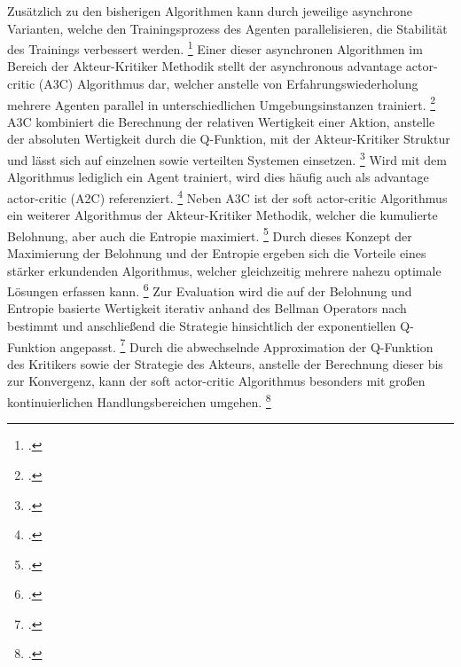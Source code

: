 Zusätzlich zu den bisherigen Algorithmen kann durch jeweilige asynchrone Varianten, welche den Trainingsprozess des Agenten parallelisieren, die Stabilität des Trainings verbessert werden. \footcite[Vgl.][S. 1]{Mnih.2016}
Einer dieser asynchronen Algorithmen im Bereich der Akteur-Kritiker Methodik stellt der asynchronous advantage actor-critic (A3C) Algorithmus dar, welcher anstelle von Erfahrungswiederholung mehrere Agenten parallel in unterschiedlichen Umgebungsinstanzen trainiert. \footcite[Vgl.][S. 1]{Mnih.2016}
A3C kombiniert die Berechnung der relativen Wertigkeit einer Aktion, anstelle der absoluten Wertigkeit durch die Q-Funktion, mit der Akteur-Kritiker Struktur und lässt sich auf einzelnen sowie verteilten Systemen einsetzen. \footcite[Vgl.][S. 9]{Arulkumaran.2017} 
Wird mit dem Algorithmus lediglich ein Agent trainiert, wird dies häufig auch als advantage actor-critic (A2C) referenziert. \footcite[Vgl.][S. 9]{Arulkumaran.2017} 
Neben A3C ist der soft actor-critic Algorithmus ein weiterer Algorithmus der Akteur-Kritiker Methodik, welcher die kumulierte Belohnung, aber auch die Entropie maximiert. \footcite[Vgl.][S. 1]{Haarnoja.2018}
Durch dieses Konzept der Maximierung der Belohnung und der Entropie ergeben sich die Vorteile eines stärker erkundenden Algorithmus, welcher gleichzeitig mehrere nahezu optimale Lösungen erfassen kann. \footcite[Vgl.][S. 3]{Haarnoja.2018}
Zur Evaluation wird die auf der Belohnung und Entropie basierte Wertigkeit iterativ anhand des Bellman Operators nach \cite[]{Bellman.1966} bestimmt und anschließend die Strategie hinsichtlich der exponentiellen Q-Funktion angepasst. \footcite[Vgl.][S. 4]{Haarnoja.2018}
Durch die abwechselnde Approximation der Q-Funktion des Kritikers sowie der Strategie des Akteurs, anstelle der Berechnung dieser bis zur Konvergenz, kann der soft actor-critic Algorithmus besonders mit großen kontinuierlichen Handlungsbereichen umgehen. \footcite[Vgl.][S. 4]{Haarnoja.2018}

